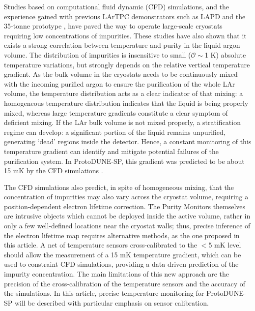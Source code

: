 Studies based on computational fluid dynamic (CFD) simulations, and the experience gained with previous LArTPC demonstrators such as LAPD \cite{lapd} and the 35-tonne prototype \cite{35t_1,35t_2}, have paved the way to operate large-scale cryostats requiring low concentrations of impurities. These studies have also shown that it exists a strong correlation between temperature and purity in the liquid argon volume. The distribution of impurities is insensitive to small ($\mathcal{O}\sim$1 K) absolute temperature variations, but strongly depends on the relative vertical temperature gradient. As the bulk volume in the cryostats needs to be continuously mixed with the incoming purified argon to ensure the purification of the whole LAr volume, the temperature distribution acts as a clear indicator of that mixing: a homogeneous temperature distribution indicates that the liquid is being properly mixed, whereas large temperature gradients constitute a clear symptom of deficient mixing. If the LAr bulk volume is not mixed properly, a stratification regime can develop: a significant portion of the liquid remains unpurified, generating `dead' regions inside the detector. Hence, a constant monitoring of this temperature gradient can identify and mitigate potential failures of the purification system. In ProtoDUNE-SP, this gradient was predicted to be about 15 mK by the CFD simulations \cite{pdsp_tdr,dune_tdr4}. 

The CFD simulations also predict, in spite of homogeneous mixing, that the concentration of impurities may also vary across the cryostat volume, requiring a position-dependent electron lifetime correction. The Purity Monitors themselves are intrusive objects which cannot be deployed inside the active volume, rather in only a few well-defined locations near the cryostat walls; thus, precise inference of the electron lifetime map requires alternative methods, as the one proposed in this article. A net of temperature sensors cross-calibrated to the $<$5 mK level should allow the measurement of a 15 mK temperature gradient, which can be used to constraint CFD simulations, providing a data-driven prediction of the impurity concentration. The main limitations of this new approach are the precision of the cross-calibration of the temperature sensors and the accuracy of the simulations. In this article, precise temperature monitoring for ProtoDUNE-SP will be described with particular emphasis on sensor calibration.

